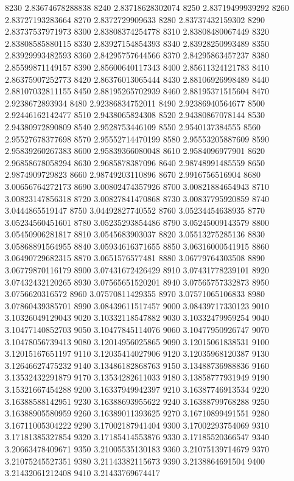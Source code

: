 {8230 2.83674678288838
8240 2.83718628302074
8250 2.83719499939292
8260 2.83727193283664
8270 2.8372729909633
8280 2.83737432159302
8290 2.83737537971973
8300 2.83808374254778
8310 2.83808480067449
8320 2.83808585880115
8330 2.83927154854393
8340 2.83928250993489
8350 2.83929993482593
8360 2.84295757644566
8370 2.84295863457237
8380 2.85599871149157
8390 2.85600640117343
8400 2.85611324121783
8410 2.86375907252773
8420 2.86376013065444
8430 2.88106926998489
8440 2.88107032811155
8450 2.88195265702939
8460 2.88195371515604
8470 2.9238672893934
8480 2.92386834752011
8490 2.92386940564677
8500 2.92446162142477
8510 2.9438065824308
8520 2.94380867078144
8530 2.94380972890809
8540 2.9528753446109
8550 2.9540137384555
8560 2.95527678377698
8570 2.95552714470199
8580 2.95553205887609
8590 2.95839260267383
8600 2.95839366080048
8610 2.9584096977901
8620 2.96858678058294
8630 2.9685878387096
8640 2.98748991485559
8650 2.9874909729823
8660 2.98749203110896
8670 2.9916756516904
8680 3.00656764272173
8690 3.00802474357926
8700 3.00821884654943
8710 3.00823147856318
8720 3.00827841470868
8730 3.00837795920859
8740 3.0444865519147
8750 3.04492827740552
8760 3.05234454638935
8770 3.05234560451601
8780 3.05235293854486
8790 3.05245009143579
8800 3.05450906281817
8810 3.0545683903037
8820 3.05513275285136
8830 3.05868891564955
8840 3.05934616371655
8850 3.06316000541915
8860 3.06490729682315
8870 3.0651576577481
8880 3.06779764303508
8890 3.06779870116179
8900 3.07431672426429
8910 3.07431778239101
8920 3.07432432120265
8930 3.07565651520201
8940 3.07565757332873
8950 3.0756620316572
8960 3.07570811429355
8970 3.07571065106833
8980 3.07860439385701
8990 3.08439611517457
9000 3.08439717330123
9010 3.10326049129043
9020 3.10332118547882
9030 3.10332479959254
9040 3.10477140852703
9050 3.10477845114076
9060 3.10477950926747
9070 3.10478056739413
9080 3.12014956025865
9090 3.12015061838531
9100 3.12015167651197
9110 3.12035414027906
9120 3.12035968120387
9130 3.12646627475232
9140 3.13486182868763
9150 3.13488736988836
9160 3.13532432291879
9170 3.13534282611033
9180 3.13858777931949
9190 3.15321667454288
9200 3.16337949942397
9210 3.16387746913534
9220 3.16388588142951
9230 3.16388693955622
9240 3.16388799768288
9250 3.16388905580959
9260 3.16389011393625
9270 3.16710899491551
9280 3.16711005304222
9290 3.17002187941404
9300 3.17002293754069
9310 3.17181385327854
9320 3.17185414553876
9330 3.17185520366547
9340 3.20663478409671
9350 3.21005535130183
9360 3.21075139714679
9370 3.21075245527351
9380 3.21143382115673
9390 3.2138864691504
9400 3.21432061212408
9410 3.21433769674417
}
